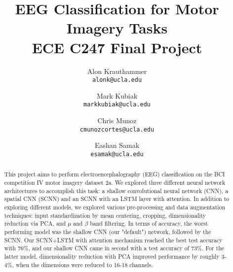 \documentclass[10pt,twocolumn,letterpaper]{article}
\begin{document}
\title{
    EEG Classification for Motor Imagery Tasks\\
    {\large ECE C247 Final Project}
}

\author{Alon Krauthammer\\
{\tt\small alonk@ucla.edu}
\and
Mark Kubiak\\
{\tt\small markkubiak@ucla.edu}
\and
Chris Munoz\\
{\tt\small cmunozcortes@ucla.edu}
\and
Eashan Samak\\
{\tt\small esamak@ucla.edu}
}

\maketitle

\begin{abstract}
    This project aims to perform electroencephalography (EEG) classification 
    on the BCI competition IV motor imagery dataset 2a. We explored three
    different neural network architectures to accomplish this task: a shallow
    convolutional neural network (CNN), a spatial CNN (SCNN) and an SCNN with an 
    LSTM layer with attention. In addition to exploring different models, 
    we explored various pre-processing and data augmentation techniques: 
    input standardization by mean centering, cropping, dimensionality 
    reduction via PCA, and $\mu$ and $\beta$ band filtering. In terms of 
    accuracy, the worst performing model was the shallow CNN (our "default") 
    network, followed by the SCNN. Our SCNN+LSTM with attention mechanism
    reached the best test accuracy with 76\%, and our shallow CNN came in second
    with a test accuracy of 73\%. For the latter model, dimensionality reduction
    with PCA improved performance by roughly 3-4\%, when the dimensions were
    reduced to 16-18 channels.
\end{abstract}

\end{document}
